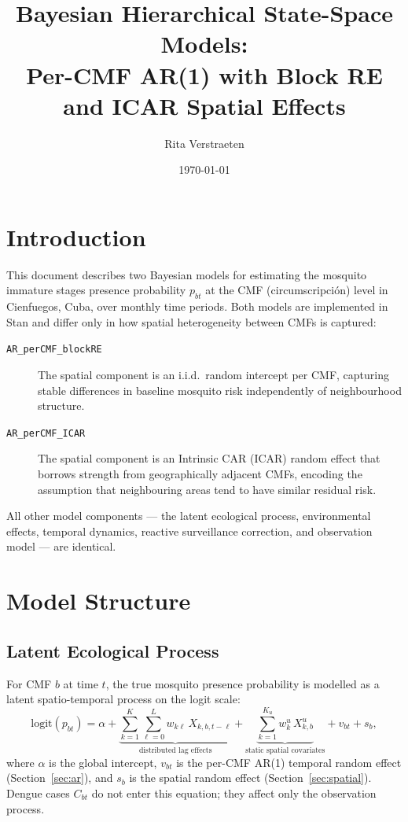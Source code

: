 \documentclass[12pt,a4paper]{article}
\title{Bayesian Hierarchical State-Space Models:\\
\large Per-CMF AR(1) with Block RE and ICAR Spatial Effects}
\author{Rita Verstraeten}
\date{\today}
\begin{document}
\maketitle

\section{Introduction}

This document describes two Bayesian models for estimating the mosquito immature stages presence probability $p_{bt}$ at the CMF (circumscripción) level in Cienfuegos, Cuba, over monthly time periods.
Both models are implemented in Stan and differ only in how spatial heterogeneity between CMFs is captured:

\begin{description}
  \item[\texttt{AR\_perCMF\_blockRE}] The spatial component is an i.i.d.\ random intercept per CMF,
    capturing stable differences in baseline mosquito risk independently of neighbourhood structure.
  \item[\texttt{AR\_perCMF\_ICAR}] The spatial component is an Intrinsic CAR (ICAR) random effect
    that borrows strength from geographically adjacent CMFs, encoding the assumption that
    neighbouring areas tend to have similar residual risk.
\end{description}

All other model components --- the latent ecological process, environmental effects, temporal
dynamics, reactive surveillance correction, and observation model --- are identical.

\section{Model Structure}

\subsection{Latent Ecological Process}

For CMF $b$ at time $t$, the true mosquito presence probability is modelled as a latent
spatio-temporal process on the logit scale:
\begin{equation}
  \text{logit}(p_{bt}) = \alpha
  + \underbrace{\sum_{k=1}^{K} \sum_{\ell=0}^{L} w_{k\ell}\, X_{k,b,t-\ell}}_{\text{distributed lag effects}}
  + \underbrace{\sum_{k=1}^{K_u} w_k^u\, X_{k,b}^u}_{\text{static spatial covariates}}
  + v_{bt}
  + s_b,
  \label{eq:lp}
\end{equation}
where $\alpha$ is the global intercept, $v_{bt}$ is the per-CMF AR(1) temporal random effect
(Section~\ref{sec:ar}), and $s_b$ is the spatial random effect (Section~\ref{sec:spatial}).
Dengue cases $C_{bt}$ do not enter this equation; they affect only the observation process.
\end{document}
